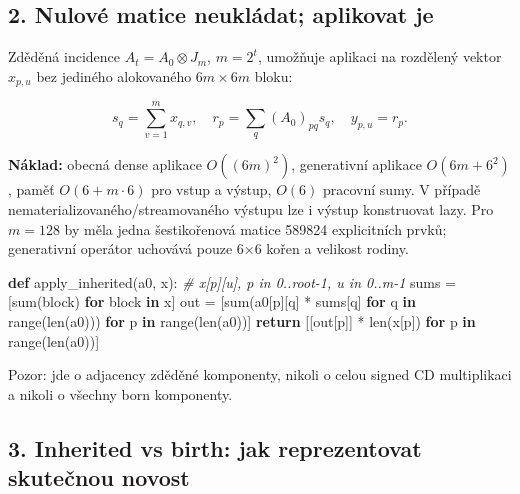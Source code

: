 \documentclass[
  10pt,
]{article}
\newenvironment{Shaded}{}{}
\newcommand{\BuiltInTok}[1]{\textcolor[rgb]{0.00,0.50,0.00}{#1}}
\newcommand{\CommentTok}[1]{\textcolor[rgb]{0.38,0.63,0.69}{\textit{#1}}}
\newcommand{\ControlFlowTok}[1]{\textcolor[rgb]{0.00,0.44,0.13}{\textbf{#1}}}
\newcommand{\KeywordTok}[1]{\textcolor[rgb]{0.00,0.44,0.13}{\textbf{#1}}}
\newcommand{\NormalTok}[1]{#1}
\newcommand{\OperatorTok}[1]{\textcolor[rgb]{0.40,0.40,0.40}{#1}}
\begin{document}
\subsection{2. Nulové matice neukládat; aplikovat
je}\label{nulovuxe9-matice-neukluxe1dat-aplikovat-je}

Zděděná incidence \(A_t=A_0\otimes J_m\), \(m=2^t\), umožňuje aplikaci
na rozdělený vektor \(x_{p,u}\) bez jediného alokovaného \(6m\times6m\)
bloku:

\[
s_q=\sum_{v=1}^{m} x_{q,v},\quad r_p=\sum_q (A_0)_{pq}s_q,\quad y_{p,u}=r_p.
\tag{1}
\]

\textbf{Náklad:} obecná dense aplikace \(O((6m)^2)\), generativní
aplikace \(O(6m+6^2)\), paměť \(O(6+m\cdot6)\) pro vstup a výstup,
\(O(6)\) pracovní sumy. V případě nematerializovaného/streamovaného
výstupu lze i výstup konstruovat lazy. Pro \(m=128\) by měla jedna
šestikořenová matice 589824 explicitních prvků; generativní operátor
uchovává pouze 6×6 kořen a velikost rodiny.

\begin{Shaded}
\begin{Highlighting}[]
\KeywordTok{def}\NormalTok{ apply\_inherited(a0, x):}
    \CommentTok{\# x[p][u], p in 0..root{-}1, u in 0..m{-}1}
\NormalTok{    sums }\OperatorTok{=}\NormalTok{ [}\BuiltInTok{sum}\NormalTok{(block) }\ControlFlowTok{for}\NormalTok{ block }\KeywordTok{in}\NormalTok{ x]}
\NormalTok{    out }\OperatorTok{=}\NormalTok{ [}\BuiltInTok{sum}\NormalTok{(a0[p][q] }\OperatorTok{*}\NormalTok{ sums[q] }\ControlFlowTok{for}\NormalTok{ q }\KeywordTok{in} \BuiltInTok{range}\NormalTok{(}\BuiltInTok{len}\NormalTok{(a0)))}
           \ControlFlowTok{for}\NormalTok{ p }\KeywordTok{in} \BuiltInTok{range}\NormalTok{(}\BuiltInTok{len}\NormalTok{(a0))]}
    \ControlFlowTok{return}\NormalTok{ [[out[p]] }\OperatorTok{*} \BuiltInTok{len}\NormalTok{(x[p]) }\ControlFlowTok{for}\NormalTok{ p }\KeywordTok{in} \BuiltInTok{range}\NormalTok{(}\BuiltInTok{len}\NormalTok{(a0))]}
\end{Highlighting}
\end{Shaded}

Pozor: jde o adjacency zděděné komponenty, nikoli o celou signed CD
multiplikaci a nikoli o všechny born komponenty.

\subsection{3. Inherited vs birth: jak reprezentovat skutečnou
novost}\label{inherited-vs-birth-jak-reprezentovat-skuteux10dnou-novost}
\end{document}
